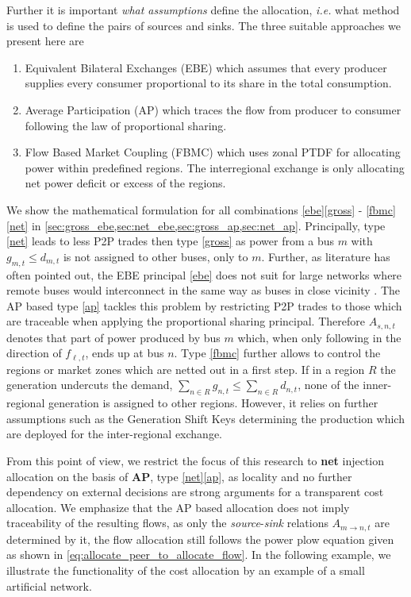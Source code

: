 \documentclass[11pt,twocolumn]{article}
\newcommand{\ie}{\textit{i.e.} }
\newcommand{\nodalgeneration}[1][n]{g_{#1,t}}
\newcommand{\flow}{f_{\ell,t}}
\newcommand{\demand}[1][n]{d_{#1,t}}
\newcommand{\nodaldemand}[1][n]{d_{#1,t}}
\newcommand{\allocategeneration}[1][s, n]{A_{#1,t}}
\newcommand{\allocatepeer}[1][m \rightarrow n]{A_{#1,t}}
\begin{document}
% 
Further it is important \textit{what assumptions} define the allocation, \ie what method is used to define the pairs of sources and sinks. The three suitable approaches we present here are
% 
\begin{enumerate}[label=\alph*., ref=\alph*]
\item Equivalent Bilateral Exchanges (EBE) \cite{galiana_transmission_2003} which assumes
that every producer supplies every consumer proportional to its share in the total consumption. \label{ebe} 
\item Average Participation (AP) \cite{bialek_tracing_1996,achayuthakan_electricity_2010} which traces the flow from producer to consumer following the law of proportional sharing. \label{ap}
\item Flow Based Market Coupling (FBMC) which uses zonal PTDF for allocating power within predefined regions. The interregional exchange is only allocating net power deficit or excess of the regions. \label{fbmc}
\end{enumerate}
% 
We show the mathematical formulation for all combinations \ref{ebe}\ref{gross} - \ref{fbmc}\ref{net} in \cref{sec:gross_ebe,sec:net_ebe,sec:gross_ap,sec:net_ap}.
% 
Principally, type \ref{net} leads to less P2P trades then type \ref{gross} as power from a bus $m$ with $\nodalgeneration[m] \le \nodaldemand[m]$ is not assigned to other buses, only to $m$. 
Further, as literature has often pointed out, the EBE principal \ref{ebe} does not suit for large networks where remote buses would interconnect in the same way as buses in close vicinity \cite{gil_multiarea_2005}. The AP based type \ref{ap} tackles this problem by restricting P2P trades to those which are traceable when applying the proportional sharing principal. Therefore $\allocategeneration$ denotes that part of power produced by bus $m$ which, when only following in the direction of $\flow$, ends up at bus $n$. Type \ref{fbmc} further allows to control the regions or market zones which are netted out in a first step. If in a region $R$ the generation undercuts the demand, $\sum_{n \in R} \nodalgeneration \le \sum_{n \in R} \demand$, none of the inner-regional generation is assigned to other regions. However, it relies on further assumptions such as the Generation Shift Keys determining the production which are deployed for the inter-regional exchange. 

From this point of view, we restrict the focus of this research to \textbf{net} injection allocation on the basis of \textbf{AP}, type \ref{net}\ref{ap}, as locality and no further dependency on external decisions are strong arguments for a transparent cost allocation. We emphasize that the AP based allocation does not imply traceability of the resulting flows, as only the \textit{source}-\textit{sink} relations $\allocatepeer$ are determined by it, the flow allocation still follows the power plow equation given as shown in \cref{eq:allocate_peer_to_allocate_flow}.
In the following example, we illustrate the functionality of the cost allocation by an example of a small artificial network.
\end{document}
